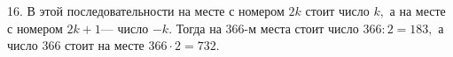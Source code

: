 16. В этой последовательности на месте с номером $2k$ стоит число $k,$ а на месте с номером $2k+1$--- число $-k.$ Тогда на 366-м места стоит число $366:2=183,$ а число 366 стоит на месте $366\cdot2=732.$\\
